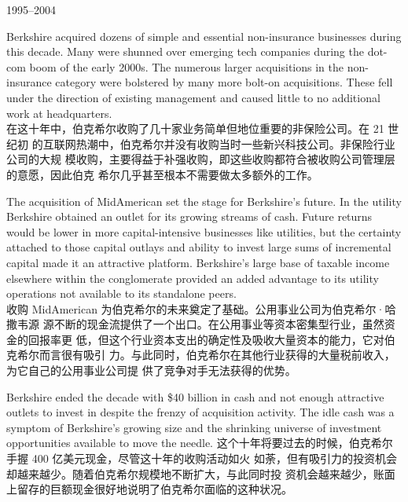 \begin{section}{1995--2004}
\begin{verseparallel}
{  }
\end{verseparallel}

\begin{verseparallel}
  {
    Berkshire acquired dozens of simple and essential non-insurance businesses
    during this decade. Many were shunned over emerging tech companies during
    the dot-com boom of the early 2000s. The numerous larger acquisitions in the
    non-insurance category were bolstered by many more bolt-on acquisitions.
    These fell under the direction of existing management and caused little to
    no additional work at headquarters. \\
  }
  {
    在这十年中，伯克希尔收购了几十家业务简单但地位重要的非保险公司。在 21 世纪初
    的互联网热潮中，伯克希尔并没有收购当时一些新兴科技公司。非保险行业公司的大规
    模收购，主要得益于补强收购，即这些收购都符合被收购公司管理层的意愿，因此伯克
    希尔几乎甚至根本不需要做太多额外的工作。
  }
\end{verseparallel}

\begin{verseparallel}
  {
    The acquisition of MidAmerican set the stage for Berkshire's future. In the
    utility Berkshire obtained an outlet for its growing streams of cash. Future
    returns would be lower in more capital-intensive businesses like utilities,
    but the certainty attached to those capital outlays and ability to invest
    large sums of incremental capital made it an attractive platform.
    Berkshire's large base of taxable income elsewhere within the conglomerate
    provided an added advantage to its utility operations not available to its
    standalone peers. \\
  }
  {
    收购 MidAmerican 为伯克希尔的未来奠定了基础。公用事业公司为伯克希尔·哈撒韦源
    源不断的现金流提供了一个出口。在公用事业等资本密集型行业，虽然资金的回报率更
    低，但这个行业资本支出的确定性及吸收大量资本的能力，它对伯克希尔而言很有吸引
    力。与此同时，伯克希尔在其他行业获得的大量税前收入，为它自己的公用事业公司提
    供了竞争对手无法获得的优势。
  }
\end{verseparallel}

\begin{verseparallel}
  {
    Berkshire ended the decade with \$40 billion in cash and not enough
    attractive outlets to invest in despite the frenzy of acquisition activity.
    The idle cash was a symptom of Berkshire's growing size and the shrinking
    universe of investment opportunities available to move the needle.
  }
  {
    这个十年将要过去的时候，伯克希尔手握 400 亿美元现金，尽管这十年的收购活动如火
    如荼，但有吸引力的投资机会却越来越少。随着伯克希尔规模地不断扩大，与此同时投
    资机会越来越少，账面上留存的巨额现金很好地说明了伯克希尔面临的这种状况。
  }
\end{verseparallel}

\end{section}


